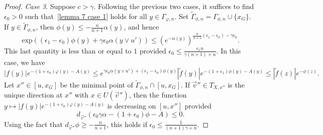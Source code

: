 \documentclass[10pt,reqno]{amsart}
\theoremstyle{plain}
\theoremstyle{definition}
\numberwithin{equation}{section}
\begin{document}
\begin{proof}
\emph{Case 3}. Suppose $c > \gamma$. 
Following the previous two cases, it suffices to find $\epsilon_0 > 0$ such that~\cref{lemma 7 case 1} holds for all $y \in \Gamma_{\varphi,n}$.
Set $\widetilde{\Gamma}_{\phi,n} = \Gamma_{\phi,n} \cup \{ x_G \}$.
If $y \in \widetilde{\Gamma}_{\phi,n}$, then $\phi(y) \leq -\frac{n}{n+1} \alpha(y)$, and hence
$$
\textrm{exp}\left( (\epsilon_1 - \epsilon_0)\phi(y) + \gamma \epsilon_0 \alpha(y \vee u') \right) \leq \left( e^{-\alpha(y)} \right)^{\frac{n}{n+1}(\epsilon_1-\epsilon_0) - \gamma  \epsilon_0}.
$$
This last quantity is less than or equal to $1$ provided $\epsilon_0 \leq \frac{\epsilon_1 n}{\gamma  (n+1) + n}$. In this case, we have
$$
|f(y)|e^{-(1+\epsilon_0)\varphi(y)-A(y)} \leq e^{\gamma  \epsilon_0 \alpha(y \vee u') + (\epsilon_1 - \epsilon_0)\phi(y)} |\tilde{f}(y)|e^{-(1+\epsilon_1 )\phi(y) - A(y)} \leq |\tilde{f}(z)| e^{-\phi(z)}.
$$
Let $x'' \in [u,x_G]$ be the minimal point of $\widetilde{\Gamma}_{\phi,n} \cap [u,x_G]$.
If $\vec{v}'' \in T_{X,x''}$ is the unique direction at $x''$ with $x \in U(\vec{v}'')$, then the function $y \mapsto |f(y)|e^{-(1+\epsilon_0)\varphi(y)-A(y)}$ is decreasing on $[u,x'']$ provided 
$$
d_{\vec{v}''}( \epsilon_0 \gamma  \alpha - (1+\epsilon_0)\phi - A ) \leq 0.
$$
Using the fact that $d_{\vec{v}''} \phi \geq -\frac{n}{n+1}$, this holds if $\epsilon_0 \leq \frac{1}{(n+1)\gamma +n}$.


\end{proof}
\end{document}
